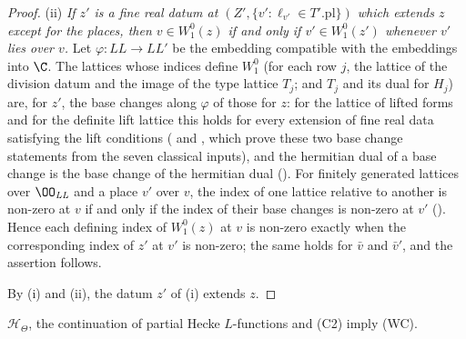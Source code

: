 \begin{proof}
(ii) \emph{If $z'$ is a fine real datum at $(Z',\{v':\ell_{v'}\in T'.\mathrm{pl}\})$ which extends $z$ except for the places, then $v\in W_1^0(z)$
if and only if $v'\in W_1^0(z')$ whenever $v'$ lies over $v$.} Let $\varphi\colon\mathit{LL}\to\mathit{LL}'$ be the embedding compatible with the
embeddings into $\C$. The lattices whose indices define $W_1^0$ (for each row $j$, the lattice of the division datum and the image of the type
lattice $T_j$; and $T_j$ and its dual for $H_j$) are, for $z'$, the base changes along $\varphi$ of those for $z$: for the lattice of lifted
forms and for the definite lift lattice this holds for every extension of fine real data satisfying the lift conditions
( and ,
which prove these two base change statements from the seven classical inputs), and the hermitian dual of a base change is the base change of the
hermitian dual (). For finitely generated lattices over $\OO_{\mathit{LL}}$ and a place
$v'$ over $v$, the index of one lattice relative to another is non-zero at $v$ if and only if the index of their base changes is non-zero at $v'$
(). Hence each defining index of $W_1^0(z)$ at $v$ is non-zero exactly
when the corresponding index of $z'$ at $v'$ is non-zero; the same holds for $\bar v$ and $\bar v'$, and the assertion follows.

By (i) and (ii), the datum $z'$ of (i) extends $z$.
\end{proof}

\begin{lemma}\label{pf:bundles:lem:WC}
$\mathcal H_\Theta$, the continuation of partial Hecke $L$-functions and (C2) imply (WC).
\end{lemma}

